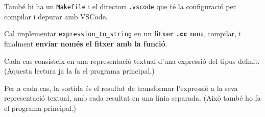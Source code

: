 També hi ha un \verb|Makefile| i el directori \verb|.vscode| 
que té la configuració per compilar i depurar amb VSCode.

\medskip

Cal implementar \verb|expression_to_string| en un 
\textbf{fitxer \texttt{.cc} nou}, compilar, i finalment 
\textbf{enviar només el fitxer amb la funció}.

\Input

Cada cas consisteix en una representació textual d'una expressió del 
tipus definit. (Aquesta lectura ja la fa el programa principal.)

\Output

Per a cada cas, la sortida és el resultat de transformar l'expressió 
a la seva representació textual, amb cada resultat en una línia separada. 
(Això també ho fa el programa principal.)

\SampleTwoCol

